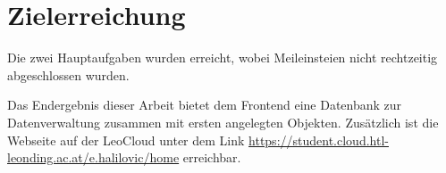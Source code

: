 \section{Zielerreichung}

Die zwei Hauptaufgaben wurden erreicht, wobei Meileinsteien nicht rechtzeitig abgeschlossen wurden. 

Das Endergebnis dieser Arbeit bietet dem Frontend eine Datenbank zur Datenverwaltung zusammen mit ersten angelegten Objekten. 
Zusätzlich ist die Webseite auf der LeoCloud unter dem Link \href{https://student.cloud.htl-leonding.ac.at/e.halilovic/home}{https://student.cloud.htl-leonding.ac.at/e.halilovic/home} erreichbar.